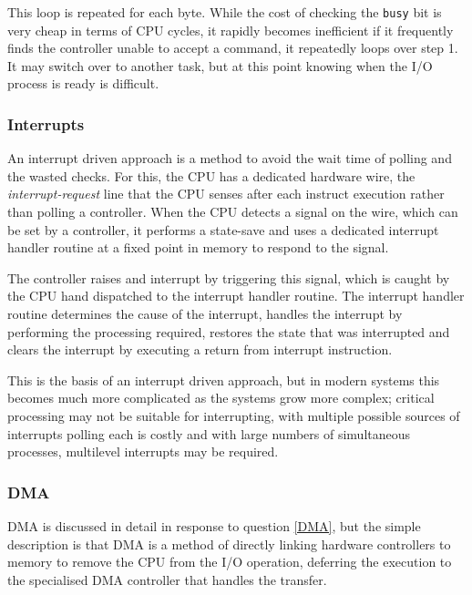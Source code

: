 \documentclass[]{article}
\begin{document}
            This loop is repeated for each byte. While the cost of checking the \texttt{busy} bit is very cheap in terms of CPU cycles, it rapidly becomes inefficient if it frequently finds the controller unable to accept a command, it repeatedly loops over step 1. It may switch over to another task, but at this point knowing when the I/O process is ready is difficult.

        \subsubsection{Interrupts}

            An interrupt driven approach is a method to avoid the wait time of polling and the wasted checks. For this, the CPU has a dedicated hardware wire, the \textit{interrupt-request} line that the CPU senses after each instruct execution rather than polling a controller. When the CPU detects a signal on the wire, which can be set by a controller, it performs a state-save and uses a dedicated interrupt handler routine at a fixed point in memory to respond to the signal.

            The controller raises and interrupt by triggering this signal, which is caught by the CPU hand dispatched to the interrupt handler routine. The interrupt handler routine determines the cause of the interrupt, handles the interrupt by performing the processing required, restores the state that was interrupted and clears the interrupt by executing a return from interrupt instruction.


            This is the basis of an interrupt driven approach, but in modern systems this becomes much more complicated as the systems grow more complex; critical processing may not be suitable for interrupting, with multiple possible sources of interrupts polling each is costly and with large numbers of simultaneous processes, multilevel interrupts may be required.

        \newpage
        \subsubsection{DMA}

            DMA is discussed in detail in response to question \ref{DMA}, but the simple description is that DMA is a method of directly linking hardware controllers to memory to remove the CPU from the I/O operation, deferring the execution to the specialised DMA controller that handles the transfer.
\end{document}
